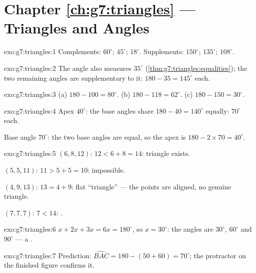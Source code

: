 \section*{Chapter \ref{ch:g7:triangles} --- Triangles and Angles}

\begin{solution}{exo:g7:triangles:1}
Complements: $60^\circ$; $45^\circ$; $18^\circ$.
Supplements: $150^\circ$; $135^\circ$; $108^\circ$.
\end{solution}

\begin{solution}{exo:g7:triangles:2}
The  angle also measures $35^\circ$
(\cref{thm:g7:triangles:equalities}); the two remaining angles are
supplementary to it: $180 - 35 = 145^\circ$ each.
\end{solution}

\begin{solution}{exo:g7:triangles:3}
(a) $180 - 100 = 80^\circ$. \quad
(b) $180 - 118 = 62^\circ$. \quad
(c) $180 - 150 = 30^\circ$.
\end{solution}

\begin{solution}{exo:g7:triangles:4}
Apex $40^\circ$: the base angles share $180 - 40 = 140^\circ$
equally: $70^\circ$ each.

Base angle $70^\circ$: the two base angles are equal, so the apex is
$180 - 2 \times 70 = 40^\circ$.
\end{solution}

\begin{solution}{exo:g7:triangles:5}
$(6, 8, 12)$: $12 < 6 + 8 = 14$: triangle exists.

$(5, 5, 11)$: $11 > 5 + 5 = 10$: impossible.

$(4, 9, 13)$: $13 = 4 + 9$: flat ``triangle'' --- the points are
aligned, no genuine triangle.

$(7, 7, 7)$: $7 < 14$: .
\end{solution}

\begin{solution}{exo:g7:triangles:6}
$x + 2x + 3x = 6x = 180^\circ$, so $x = 30^\circ$: the angles are
$30^\circ$, $60^\circ$ and $90^\circ$ --- a .
\end{solution}

\begin{solution}{exo:g7:triangles:7}
Prediction: $\widehat{BAC} = 180 - (50 + 60) = 70^\circ$; the
protractor on the finished figure confirms it.
\end{solution}

